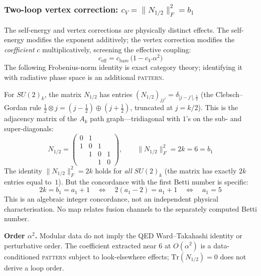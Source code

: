 \documentclass[12pt,a4paper]{article}
\theoremstyle{definition}
\begin{document}
\subsubsection*{Two-loop vertex correction: $c_V = \|N_{1/2}\|_F^2 = b_1$}

The self-energy and vertex corrections are physically distinct effects.  The self-energy modifies the exponent additively; the vertex correction modifies the \emph{coefficient} $c$ multiplicatively, screening the effective coupling:
\begin{equation}
c_{\mathrm{eff}} = c_{\mathrm{bare}} \,\bigl(1 - c_V\,\alpha^2\bigr)
\label{eq:vertex}
\end{equation}
The following Frobenius-norm identity is exact category theory; identifying it with radiative phase space is an additional \textsc{pattern}.

For $SU(2)_k$, the matrix $N_{1/2}$ has entries $(N_{1/2})_{jj'} = \delta_{|j-j'|,\frac{1}{2}}$ (the Clebsch--Gordan rule $\tfrac{1}{2} \otimes j = (j{-}\tfrac{1}{2}) \oplus (j{+}\tfrac{1}{2})$, truncated at $j = k/2$).  This is the adjacency matrix of the $A_k$ path graph---tridiagonal with $1$'s on the sub- and super-diagonals:
\begin{equation}
N_{1/2} = \begin{pmatrix} 0 & 1 & & \\ 1 & 0 & 1 & \\ & 1 & 0 & 1 \\ & & 1 & 0 \end{pmatrix}, \qquad
\|N_{1/2}\|_F^2 = 2k = 6 = b_1
\label{eq:frobenius}
\end{equation}
The identity $\|N_{1/2}\|_F^2 = 2k$ holds for \emph{all} $SU(2)_k$ (the matrix has exactly $2k$ entries equal to~$1$).  But the concordance with the first Betti number is specific:
\begin{equation}
2k = b_1 = a_1 + 1 \quad\Longleftrightarrow\quad 2(a_1 - 2) = a_1 + 1 \quad\Longleftrightarrow\quad a_1 = 5
\label{eq:vertex_char}
\end{equation}
This is an algebraic integer concordance, not an independent physical characterisation.  No map relates fusion channels to the separately computed Betti number.

\textbf{Order $\alpha^2$.}  Modular data do not imply the QED Ward--Takahashi identity or perturbative order.  The coefficient extracted near \(6\) at \(O(\alpha^2)\) is a data-conditioned \textsc{pattern} subject to look-elsewhere effects; \(\mathrm{Tr}(N_{1/2})=0\) does not derive a loop order.
\end{document}
